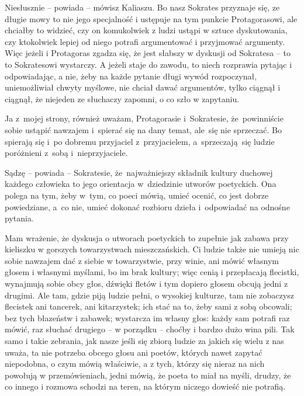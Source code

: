 \documentclass[a4paper,11pt]{article}
\begin{document}
\noindent
Niesłusznie -- powiada -- mówisz Kaliaszu. Bo nasz Sokrates
przyznaje się, ze długie mowy to nie jego specjalność i ustępuje na
tym punkcie Protagorasowi, ale chciałby to widzieć, czy on komukolwiek
z ludzi ustąpi w sztuce dyskutowania, czy ktokolwiek lepiej od niego
potrafi argumentować i przyjmować argumenty. Więc jeżeli i Protagoras
zgadza się, że jest słabszy w dyskusji od Sokratesa -- to to
Sokratesowi wystarczy. A jeżeli staje do zawodu, to niech rozprawia
pytając i odpowiadając, a nie, żeby na każde pytanie długi wywód
rozpoczynał, uniemożliwiał chwyty myślowe, nie chciał dawać
argumentów, tylko ciągnął i ciągnął, że niejeden ze słuchaczy zapomni,
o co szło w zapytaniu.


\vspace{\spaceThree}



\noindent
Ja z~mojej strony, również uważam, Protagorasie i~Sokratesie,
że~powinniście sobie ustąpić nawzajem i~spierać się na dany temat,
ale~się nie sprzeczać. Bo spierają się i~po dobremu przyjaciel
z~przyjacielem, a~sprzeczają~się ludzie poróżnieni z~sobą
i~nieprzyjaciele.


\vspace{\spaceThree}



\noindent
Sądzę -- powiada -- Sokratesie, że~najważniejszy składnik kultury
duchowej każdego człowieka to jego orientacja w~dziedzinie utworów
poetyckich. Ona polega na tym, żeby w~tym, co poeci mówią, umieć
ocenić, co jest dobrze powiedziane, a~co nie, umieć dokonać rozbioru
dzieła i~odpowiadać na odnośne pytania.


\vspace{\spaceThree}



Mam wrażenie, że dyskusja o utworach poetyckich to zupełnie jak zabawa
przy kieliszku w gorszych towarzystwach mieszczańskich. Ci ludzie
także nie umieją nic sobie nawzajem dać z siebie w towarzystwie, przy
winie, ani mówić własnym głosem i własnymi myślami, bo im brak
kultury; więc cenią i przepłacają flecistki, wynajmują sobie obcy
głos, dźwięki fletów i tym dopiero głosem obcują jedni z drugimi. Ale
tam, gdzie piją ludzie pełni, o wysokiej kulturze, tam nie zobaczysz
flecistek ani tancerek, ani kitarzystek; ich stać na to, żeby sami z
sobą obcowali; bez tych błazeństw i zabawek; wystarcza im własny głos:
każdy sam potrafi raz mówić, raz słuchać drugiego -- w porządku --
choćby i bardzo dużo wina pili. Tak samo i takie zebrania, jak nasze
jeśli się zbiorą ludzie za jakich się wielu z nas uważa, ta nie
potrzeba obcego głosu ani poetów, których nawet zapytać niepodobna, o
czym mówią właściwie, a z tych, którzy się nieraz na nich powołują w
przemówieniach, jedni mówią, że poeta to miał na myśli, drudzy, że co
innego i rozmowa schodzi na teren, na którym niczego dowieść nie
potrafią.
\end{document}
